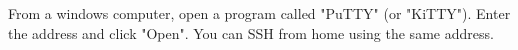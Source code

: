 
From a windows computer, open a program called "PuTTY" (or "KiTTY"). Enter the address  and click "Open". You can SSH from home using the same address. %








